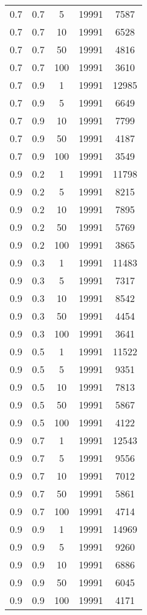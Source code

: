 \begin{appendices}
\begin{longtable}{|c|c|c|c|c|}
		0.7 & 0.7 & 5   & 19991 & 7587  \\
		0.7 & 0.7 & 10  & 19991 & 6528  \\
		0.7 & 0.7 & 50  & 19991 & 4816  \\
		0.7 & 0.7 & 100 & 19991 & 3610  \\ \hline
		0.7 & 0.9 & 1   & 19991 & 12985 \\
		0.7 & 0.9 & 5   & 19991 & 6649  \\
		0.7 & 0.9 & 10  & 19991 & 7799  \\
		0.7 & 0.9 & 50  & 19991 & 4187  \\
		0.7 & 0.9 & 100 & 19991 & 3549  \\ \hline
		0.9 & 0.2 & 1   & 19991 & 11798 \\
		0.9 & 0.2 & 5   & 19991 & 8215  \\
		0.9 & 0.2 & 10  & 19991 & 7895  \\
		0.9 & 0.2 & 50  & 19991 & 5769  \\ 
		0.9 & 0.2 & 100 & 19991 & 3865  \\ \hline
		0.9 & 0.3 & 1   & 19991 & 11483 \\
		0.9 & 0.3 & 5   & 19991 & 7317  \\
		0.9 & 0.3 & 10  & 19991 & 8542  \\
		0.9 & 0.3 & 50  & 19991 & 4454  \\
		0.9 & 0.3 & 100 & 19991 & 3641  \\ \hline
		0.9 & 0.5 & 1   & 19991 & 11522 \\
		0.9 & 0.5 & 5   & 19991 & 9351  \\
		0.9 & 0.5 & 10  & 19991 & 7813  \\
		0.9 & 0.5 & 50  & 19991 & 5867  \\
		0.9 & 0.5 & 100 & 19991 & 4122  \\ \hline
		0.9 & 0.7 & 1   & 19991 & 12543 \\
		0.9 & 0.7 & 5   & 19991 & 9556  \\
		0.9 & 0.7 & 10  & 19991 & 7012  \\
		0.9 & 0.7 & 50  & 19991 & 5861  \\
		0.9 & 0.7 & 100 & 19991 & 4714  \\ \hline
		0.9 & 0.9 & 1   & 19991 & 14969 \\
		0.9 & 0.9 & 5   & 19991 & 9260  \\
		0.9 & 0.9 & 10  & 19991 & 6886  \\
		0.9 & 0.9 & 50  & 19991 & 6045  \\
		0.9 & 0.9 & 100 & 19991 & 4171 \\ \hline

\end{longtable}
\end{appendices}
